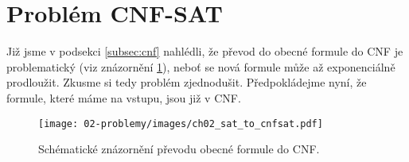 \section{Problém CNF-SAT}\label{sec:cnf_sat}

Již jsme v podsekci \ref{subsec:cnf} nahlédli, že převod do obecné formule do CNF je problematický (viz znázornění \ref{fig:sat_to_cnfsat}), neboť se nová formule může až exponenciálně prodloužit. Zkusme si tedy problém zjednodušit. Předpokládejme nyní, že formule, které máme na vstupu, jsou již v CNF.

\begin{figure}[h]
    \centering
    \texttt{[image: 02-problemy/images/ch02\_sat\_to\_cnfsat.pdf]}
    \caption{Schématické znázornění převodu obecné formule do CNF.}
    \label{fig:sat_to_cnfsat}
\end{figure}

